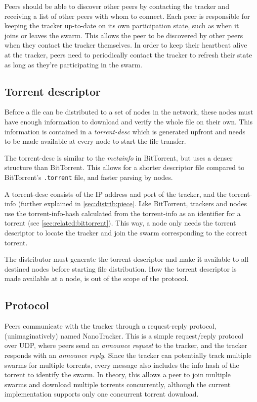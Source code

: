 Peers should be able to discover other peers by contacting the tracker and receiving a list of other peers with whom to connect. Each peer is responsible for keeping the tracker up-to-date on its own participation state, such as when it joins or leaves the swarm. This allows the peer to be discovered by other peers when they contact the tracker themselves. In order to keep their heartbeat alive at the tracker, peers need to periodically contact the tracker to refresh their state as long as they're participating in the swarm.

\subsection{Torrent descriptor}
\label{sec:discovery:torrent-desc}
Before a file can be distributed to a set of nodes in the network, these nodes must have enough information to download and verify the whole file on their own. This information is contained in a \emph{\gls{torrent-desc}} which is generated upfront and needs to be made available at every node to start the file transfer.

The \gls{torrent-desc} is similar to the \emph{metainfo} in BitTorrent, but uses a denser structure than BitTorrent. This allows for a shorter descriptor file compared to BitTorrent's \texttt{.torrent} file, and faster parsing by nodes.

A \gls{torrent-desc} consists of the \gls{IP} address and port of the tracker, and the \gls{torrent-info} (further explained in \ref{sec:distrib:piece}. Like BitTorrent, trackers and nodes use the \gls{torrent-info-hash} calculated from the \gls{torrent-info} as an identifier for a torrent (see \ref{sec:related:bittorrent}). This way, a node only needs the torrent descriptor to locate the tracker and join the swarm corresponding to the correct torrent.

The distributor must generate the torrent descriptor and make it available to all destined nodes before starting file distribution. How the torrent descriptor is made available at a node, is out of the scope of the protocol.

\subsection{Protocol}
Peers communicate with the tracker through a request-reply protocol, (unimaginatively) named NanoTracker. This is a simple request/reply protocol over \gls{UDP}, where peers send an \emph{announce request} to the tracker, and the tracker responds with an \emph{announce reply}. Since the tracker can potentially track multiple swarms for multiple torrents, every message also includes the info hash of the torrent to identify the swarm. In theory, this allows a peer to join multiple swarms and download multiple torrents concurrently, although the current implementation supports only one concurrent torrent download.

